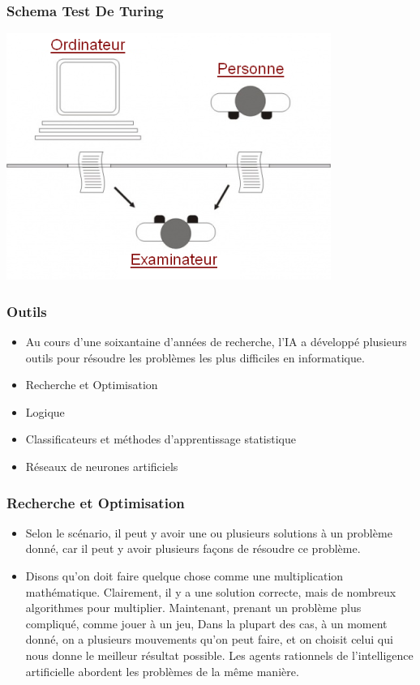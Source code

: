 \documentclass{beamer}
\begin{document}
	\begin{frame}[fragile]
		\frametitle{Schema Test De Turing}
		
		\centerline{\includegraphics[scale = 0.7]{test-de-turing.png}}
	
	\end{frame}
	
	\begin{frame}
		\frametitle{Outils}
		\begin{itemize}
			\item Au cours d'une soixantaine d'années de recherche, l'IA a développé plusieurs outils pour résoudre les problèmes les plus difficiles en informatique.
			\item Recherche et Optimisation
			\item Logique
			\item Classificateurs et méthodes d'apprentissage statistique
			\item Réseaux de neurones artificiels
		\end{itemize}
	\end{frame}
	
	\begin{frame}[fragile]
		\frametitle{Recherche et Optimisation}
		\begin{itemize}
		    \item Selon le scénario, il peut y avoir une ou plusieurs solutions à un problème donné, car il peut y avoir plusieurs façons de résoudre ce problème. 
		    \item Disons qu'on doit faire quelque chose comme une multiplication mathématique. Clairement, il y a une solution correcte, mais de nombreux algorithmes pour multiplier. Maintenant, prenant un problème plus compliqué, comme jouer à un jeu, Dans la plupart des cas, à un moment donné, on a plusieurs mouvements qu'on peut faire, et on choisit celui qui nous donne le meilleur résultat possible. Les agents rationnels de l'intelligence artificielle abordent les problèmes de la même manière.
		\end{itemize}
	\end{frame}
	
\end{document}
